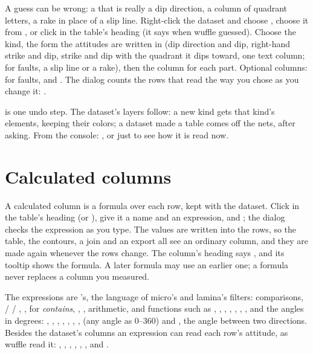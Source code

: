 A guess can be wrong: a  that is really a dip direction, a column of quadrant letters, a rake in
place of a slip line. Right-click the dataset and choose , choose it from , or click
 in the table's heading (it says  when wuffle guessed). Choose the
kind, the form the attitudes are written in (dip direction and dip, right-hand strike and dip, strike and
dip with the quadrant it dips toward, one text column; for faults, a slip line or a rake), then the column
for each part. Optional columns:  for faults,  and . The dialog counts the rows
that read the way you chose as you change it: .

 is one undo step. The dataset's layers follow: a new kind gets that kind's elements, keeping
their colors; a dataset made a table comes off the nets, after asking. From the console:
, or just  to see how it is read now.

\section{Calculated columns}\label{sec:calc}

A calculated column is a formula over each row, kept with the dataset. Click  in the
table's heading (or ), give it a name and an expression, and ; the dialog checks the expression as you
type. The values are written into the rows, so the table, the contours, a join and an export all see an
ordinary column, and they are made again whenever the rows change. The column's heading says , and
its tooltip shows the formula. A later formula may use an earlier one; a formula never replaces a column
you measured.

The expressions are 's, the language of micro's and lamina's filters: comparisons,
 /  / , , \code{\textasciitilde} for \emph{contains},
, , arithmetic, and functions such as , , , ,
, , , and the angles in degrees: , , ,
, , , ,  (any angle as 0–360) and
, the angle between two directions. Besides the dataset's columns an
expression can read each row's attitude, as wuffle read it: , , ,
, , ,  and .


